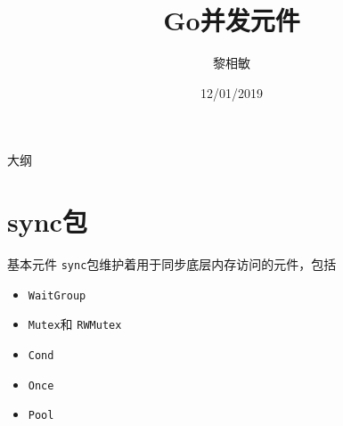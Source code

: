 \documentclass{beamer}
\title{Go并发元件}
\author{黎相敏}
\institute{上海观源信息科技有限公司 \\ 上海市闵行区紫竹科技园4号楼303B}
\date{12/01/2019}
\newcommand{\Cond}{\texttt{Cond}}
\newcommand{\Mutex}{\texttt{Mutex}}
\newcommand{\Once}{\texttt{Once}}
\newcommand{\Pool}{\texttt{Pool}}
\newcommand{\RWMutex}{\texttt{RWMutex}}
\newcommand{\WaitGroup}{\texttt{WaitGroup}}
\begin{document}
    \begin{frame}
        \maketitle
    \end{frame}

    \begin{frame}{大纲}
        \tableofcontents
    \end{frame}


    \section{sync包}
        \begin{frame}{基本元件}
        \texttt{sync}包维护着用于同步底层内存访问的元件，包括
        \begin{itemize}
            \item \WaitGroup
            \item \Mutex 和 \RWMutex
            \item \Cond
            \item \Once
            \item \Pool
        \end{itemize} 
        \end{frame}

    
\end{document}
